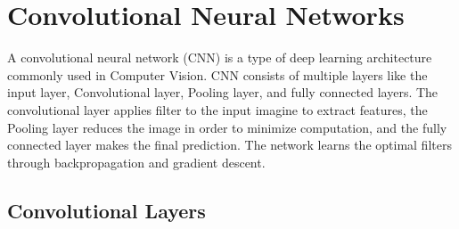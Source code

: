 \section{Convolutional Neural Networks}
A convolutional neural network (CNN) is a type of deep learning architecture commonly used in Computer Vision. 
CNN consists of multiple layers like the input layer, Convolutional layer, Pooling layer, and fully connected layers. 
The convolutional layer applies filter to the input imagine to extract features, the Pooling layer reduces the image in order to minimize computation,
and the fully connected layer makes the final prediction. The network learns the optimal filters through backpropagation and gradient descent. 

\subsection{Convolutional Layers}

%